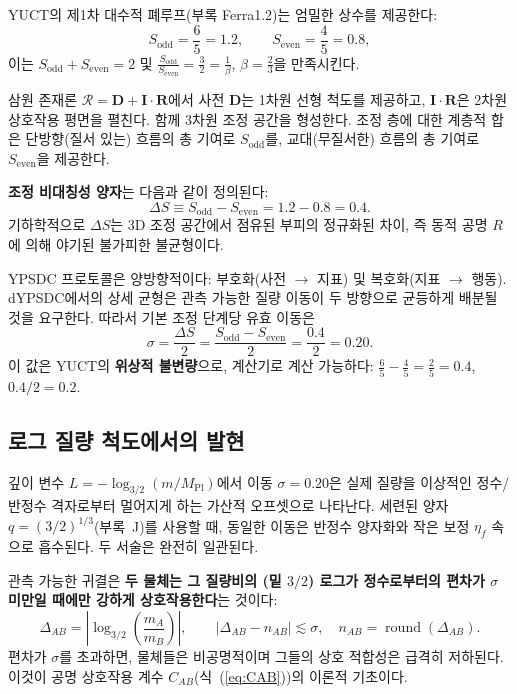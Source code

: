\documentclass[11pt,a4paper]{article}
\theoremstyle{remark}
\begin{document}
	YUCT의 제1차 대수적 폐루프(부록 Ferra1.2)는 엄밀한 상수를 제공한다:
	\begin{equation}
		S_{\mathrm{odd}} = \frac{6}{5} = 1.2,\qquad S_{\mathrm{even}} = \frac{4}{5} = 0.8,
	\end{equation}
	이는 \(\displaystyle S_{\mathrm{odd}}+S_{\mathrm{even}}=2\) 및 \(\displaystyle \frac{S_{\mathrm{odd}}}{S_{\mathrm{even}}}=\frac{3}{2}=\frac{1}{\beta}\), \(\beta=\frac{2}{3}\)을 만족시킨다.
	
	삼원 존재론 \(\mathcal{R}=\mathbf{D}+\mathbf{I}\!\cdot\!\mathbf{R}\)에서 사전 \(\mathbf{D}\)는 1차원 선형 척도를 제공하고, \(\mathbf{I}\!\cdot\!\mathbf{R}\)은 2차원 상호작용 평면을 펼친다. 함께 3차원 조정 공간을 형성한다. 조정 층에 대한 계층적 합은 단방향(질서 있는) 흐름의 총 기여로 \(S_{\mathrm{odd}}\)를, 교대(무질서한) 흐름의 총 기여로 \(S_{\mathrm{even}}\)을 제공한다.
	
	\textbf{조정 비대칭성 양자}는 다음과 같이 정의된다:
	\begin{equation}
		\Delta S \equiv S_{\mathrm{odd}} - S_{\mathrm{even}} = 1.2 - 0.8 = 0.4.
		\label{eq:DS}
	\end{equation}
	기하학적으로 \(\Delta S\)는 3D 조정 공간에서 점유된 부피의 정규화된 차이, 즉 동적 공명 \(R\)에 의해 야기된 불가피한 불균형이다.
	
	YPSDC 프로토콜은 양방향적이다: 부호화(사전 \(\to\) 지표) 및 복호화(지표 \(\to\) 행동). dYPSDC에서의 상세 균형은 관측 가능한 질량 이동이 두 방향으로 균등하게 배분될 것을 요구한다. 따라서 기본 조정 단계당 유효 이동은
	\begin{equation}
		\boxed{\sigma = \frac{\Delta S}{2} = \frac{S_{\mathrm{odd}} - S_{\mathrm{even}}}{2} = \frac{0.4}{2} = 0.20.}
		\label{eq:sigma}
	\end{equation}
	이 값은 YUCT의 \textbf{위상적 불변량}으로, 계산기로 계산 가능하다: \(\frac{6}{5} - \frac{4}{5} = \frac{2}{5} = 0.4\), \(0.4/2 = 0.2\).
	
	\subsection{로그 질량 척도에서의 발현}
	
	깊이 변수 \(L = -\log_{3/2}(m/M_{\mathrm{Pl}})\)에서 이동 \(\sigma = 0.20\)은 실제 질량을 이상적인 정수/반정수 격자로부터 멀어지게 하는 가산적 오프셋으로 나타난다. 세련된 양자 \(q = (3/2)^{1/3}\)(부록~J)를 사용할 때, 동일한 이동은 반정수 양자화와 작은 보정 \(\eta_f\) 속으로 흡수된다. 두 서술은 완전히 일관된다.
	
	관측 가능한 귀결은 \textbf{두 물체는 그 질량비의 (밑 \(3/2\)) 로그가 정수로부터의 편차가 \(\sigma\) 미만일 때에만 강하게 상호작용한다}는 것이다:
	\begin{equation}
		\Delta_{AB} = \left| \log_{3/2}\!\left(\frac{m_A}{m_B}\right) \right|,\qquad |\Delta_{AB} - n_{AB}| \lesssim \sigma,\quad n_{AB} = \operatorname{round}(\Delta_{AB}).
	\end{equation}
	편차가 \(\sigma\)를 초과하면, 물체들은 비공명적이며 그들의 상호 적합성은 급격히 저하된다. 이것이 공명 상호작용 계수 \(C_{AB}\)(식~(\ref{eq:CAB}))의 이론적 기초이다.
	
\end{document}
